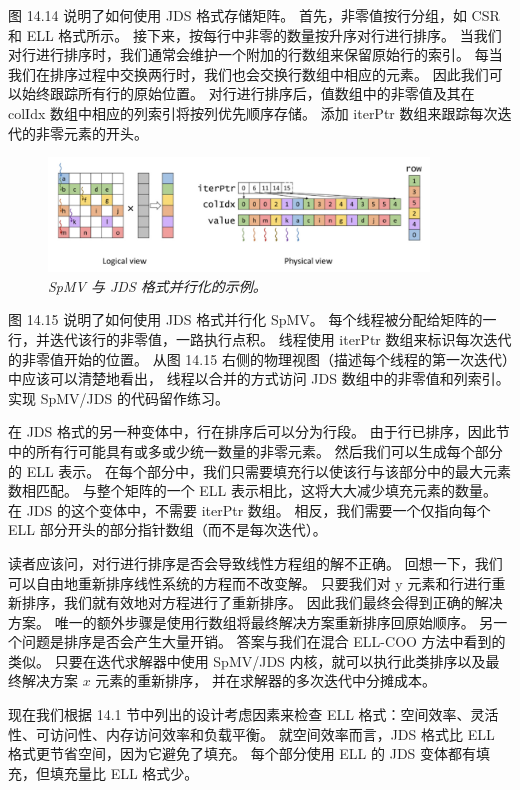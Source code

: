 图 14.14 说明了如何使用 JDS 格式存储矩阵。 首先，非零值按行分组，如 CSR 和 ELL 格式所示。 
接下来，按每行中非零的数量按升序对行进行排序。 当我们对行进行排序时，我们通常会维护一个附加的行数组来保留原始行的索引。 
每当我们在排序过程中交换两行时，我们也会交换行数组中相应的元素。 因此我们可以始终跟踪所有行的原始位置。 
对行进行排序后，值数组中的非零值及其在 colIdx 数组中相应的列索引将按列优先顺序存储。 
添加 iterPtr 数组来跟踪每次迭代的非零元素的开头。

\begin{figure}[H]
	\centering
	\includegraphics[width=0.9\textwidth]{figs/F14.15.png}
	\caption{\textit{SpMV 与 JDS 格式并行化的示例。}}
\end{figure}

图 14.15 说明了如何使用 JDS 格式并行化 SpMV。 每个线程被分配给矩阵的一行，并迭代该行的非零值，一路执行点积。 
线程使用 iterPtr 数组来标识每次迭代的非零值开始的位置。 
从图 14.15 右侧的物理视图（描述每个线程的第一次迭代）中应该可以清楚地看出，
线程以合并的方式访问 JDS 数组中的非零值和列索引。 实现 SpMV/JDS 的代码留作练习。

在 JDS 格式的另一种变体中，行在排序后可以分为行段。 
由于行已排序，因此节中的所有行可能具有或多或少统一数量的非零元素。 然后我们可以生成每个部分的 ELL 表示。 
在每个部分中，我们只需要填充行以使该行与该部分中的最大元素数相匹配。 
与整个矩阵的一个 ELL 表示相比，这将大大减少填充元素的数量。 在 JDS 的这个变体中，不需要 iterPtr 数组。 
相反，我们需要一个仅指向每个 ELL 部分开头的部分指针数组（而不是每次迭代）。

读者应该问，对行进行排序是否会导致线性方程组的解不正确。 回想一下，我们可以自由地重新排序线性系统的方程而不改变解。 
只要我们对 y 元素和行进行重新排序，我们就有效地对方程进行了重新排序。 因此我们最终会得到正确的解决方案。 
唯一的额外步骤是使用行数组将最终解决方案重新排序回原始顺序。 另一个问题是排序是否会产生大量开销。 
答案与我们在混合 ELL-COO 方法中看到的类似。 
只要在迭代求解器中使用 SpMV/JDS 内核，就可以执行此类排序以及最终解决方案 $x$ 元素的重新排序，
并在求解器的多次迭代中分摊成本。

现在我们根据 14.1 节中列出的设计考虑因素来检查 ELL 格式：空间效率、灵活性、可访问性、内存访问效率和负载平衡。 
就空间效率而言，JDS 格式比 ELL 格式更节省空间，因为它避免了填充。 
每个部分使用 ELL 的 JDS 变体都有填充，但填充量比 ELL 格式少。

